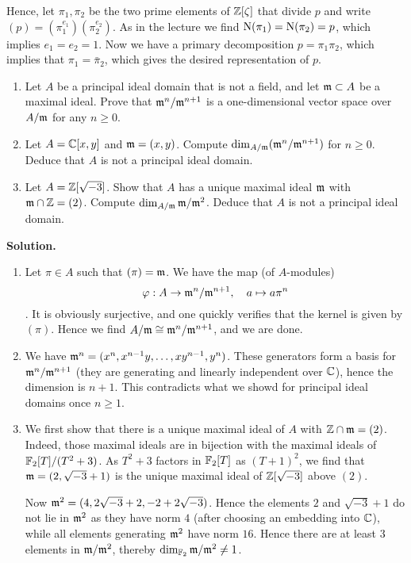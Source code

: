 \documentclass[a4paper,11pt]{article}
\begin{document}
\begin{enumerate}
        Hence, let $\pi_1, \pi_2$ be the two prime elements of 
        $\mathbb{Z}[\zeta]$ that divide $p$ and write $(p) = (\pi_1^{e_1})(\pi_2^{e_2})$. 
        As in the lecture we find $\operatorname{N}(\pi_1) = \operatorname{N}(\pi_2) = p$, which 
        implies $e_1 = e_2 = 1$. Now we have a primary decomposition 
        $p = \pi_1 \pi_2$, which implies that $\pi_1 = \bar \pi_2$, which
        gives the desired representation of $p$. 

\end{enumerate}

\begin{enumerate}
    \item Let $A$ be a principal ideal domain that is not a field, and let $\mathfrak{m}
        \subset A$ be a maximal ideal. Prove that $\mathfrak{m}^n/\mathfrak{m}^{n+1}$ is a
        one-dimensional vector space over $A/\mathfrak{m}$ for any $n \geq 0$. 
    \item Let $A = \mathbb{C}[x,y]$ and $\mathfrak{m} = (x,y)$. Compute $\dim_{A/\mathfrak{m}} (\mathfrak{m}^n
        /\mathfrak{m}^{n+1})$ for $n \geq 0$. Deduce that $A$ is not a principal ideal
        domain. 
    \item Let $A = \mathbb{Z}[\sqrt{-3}]$. Show that $A$ has a unique maximal ideal $\mathfrak{m}$
        with $\mathfrak{m} \cap \mathbb{Z} = (2)$. Compute $\dim_{A/\mathfrak{m}} \mathfrak{m}/\mathfrak{m}^2$. Deduce that 
        $A$ is not a principal ideal domain.
\end{enumerate}

\textbf{Solution.}
\begin{enumerate}
    \item Let $\pi \in A$ such that $(\pi) = \mathfrak{m}$. We have the map (of $A$-modules)
        $$\varphi: A \to \mathfrak{m}^n/\mathfrak{m}^{n+1}, \quad a \mapsto a \pi^n$$. 
        It is obviously surjective, and one quickly verifies that the kernel is
        given by $(\pi)$. Hence we find $A/\mathfrak{m} \cong \mathfrak{m}^n/\mathfrak{m}^{n+1}$, and we
        are done. 
    \item We have $\mathfrak{m}^n = (x^n, x^{n-1}y, \dots, xy^{n-1},y^n)$. These generators
        form a basis for $\mathfrak{m}^{n}/\mathfrak{m}^{n+1}$ (they are generating and linearly
        independent over $\mathbb{C}$), hence the dimension is $n+1$. This contradicts
        what we showd for principal ideal domains once $n \geq 1$. 
    \item We first show that there is a unique maximal ideal of $A$ with 
        $\mathbb{Z} \cap \mathfrak{m} = (2)$. Indeed, those maximal ideals are in bijection with
        the maximal ideals of $\mathbb{F}_2[T]/(T^2 + 3)$. As $T^2 + 3$ factors in 
        $\mathbb{F}_2[T]$ as $(T+1)^2$, we find that $\mathfrak{m} = (2, \sqrt{-3} + 1)$ is the
        unique maximal ideal of $\mathbb{Z}[\sqrt{-3}]$ above $(2)$. 

        Now $\mathfrak{m}^2 = (4, 2 \sqrt{-3} + 2, -2 + 2\sqrt{-3})$. Hence the elements
        $2$ and $\sqrt{-3}+1$ do not lie in $\mathfrak{m}^2$ as they have norm $4$ (after
        choosing an embedding into $\mathbb{C}$), while all elements generating
        $\mathfrak{m}^2$ have norm $16$. Hence there are at least $3$ elements in 
        $\mathfrak{m}/\mathfrak{m}^2$, thereby $\dim_{\mathbb{F}_2}{\mathfrak{m}/\mathfrak{m}^2} \neq 1$. 
\end{enumerate}
\end{document}
